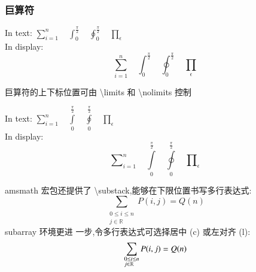 \documentclass[a4paper]{ctexart}
\begin{document}
    \subsubsection{巨算符}
    In text:
    $
        \sum_{i=1}^n   \quad
        \int_0^{\frac{\pi}{2}}   \quad
        \oint_0^{\frac{\pi}{2}} \quad
        \prod_{\epsilon}
    $\\
    In display:
    \[
        \sum_{i=1}^n    \quad 
        \int_0^{\frac{\pi}{2}}\quad
        \oint_0^{\frac{\pi}{2}} \quad 
        \prod_{\epsilon}    
    \]\par
    巨算符的上下标位置可由 \textbackslash limits 和 \textbackslash nolimits 控制\par
    In text:
    $
        \sum\limits_{i=1}^n \quad
        \int\limits_0^{\frac{\pi}{2}}   \quad
        \oint\limits_0^{\frac{\pi}{2}}  \quad
        \prod\limits_{\epsilon}
    $\\
    In display:
    \[
        \sum\nolimits_{i = 1}^n \quad
        \int\limits_0^{\frac{\pi}{2}} \quad
        \oint\limits_0^{\frac{\pi}{2}} \quad
        \prod\nolimits_{\epsilon}    
    \]\par
    amsmath 宏包还提供了 \textbackslash substack,能够在下限位置书写多行表达式:
    \[
        \sum_{\substack{0\le i\le n\\
                        j\in\mathbb{R}}} P(i,j) = Q(n)    
    \]
    subarray 环境更进 一步,令多行表达式可选择居中 (c) 或左对齐 (l):
    \[
        \sum_{\begin{subarray}{l}
                    0\le i\le n\\
                    j\in\mathbb{R}
              \end{subarray}} P(i,j) = 
        Q(n)
    \]
\end{document}
